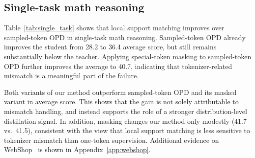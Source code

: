 \documentclass{article}
\begin{document}
\subsection{Single-task math reasoning}
\label{subsec:single_task}


Table~\ref{tab:single_task} shows that local support matching improves over sampled-token OPD in single-task math reasoning. Sampled-token OPD already improves the student from 28.2 to 36.4 average score, but still remains substantially below the teacher. Applying special-token masking to sampled-token OPD further improves the average to 40.7, indicating that tokenizer-related mismatch is a meaningful part of the failure.

Both variants of our method outperform sampled-token OPD and its masked variant in average score. This shows that the gain is not solely attributable to mismatch handling, and instead supports the role of a stronger distribution-level distillation signal. In addition, masking changes our method only modestly (41.7 vs.\ 41.5), consistent with the view that local support matching is less sensitive to tokenizer mismatch than one-token supervision. Additional evidence on WebShop~\citep{webshop2023} is shown in Appendix~\ref{app:webshop}.



\begin{table}[t]
\vspace{-0.6em}
\centering
\small
{}
\caption{Results on single-task math reasoning.}
\vspace{-1em}
\label{tab:single_task}
\end{table}
\end{document}
